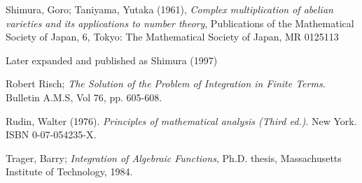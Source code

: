 \begin{thebibliography}{9}
Shimura, Goro; Taniyama, Yutaka (1961), {\it Complex multiplication of abelian varieties and its applications to number theory},
Publications of the Mathematical Society of Japan, 6, Tokyo: The Mathematical Society of Japan, MR 0125113

Later expanded and published as Shimura (1997)

Robert Risch; {\it The Solution of the Problem of Integration in Finite Terms}.  Bulletin A.M.S, Vol 76, pp. 605-608.

Rudin, Walter (1976). {\it Principles of mathematical analysis (Third ed.)}. New York. ISBN 0-07-054235-X.

Trager, Barry; {\it Integration of Algebraic Functions}, Ph.D. thesis, Massachusetts Institute of Technology, 1984.


\end{thebibliography}
